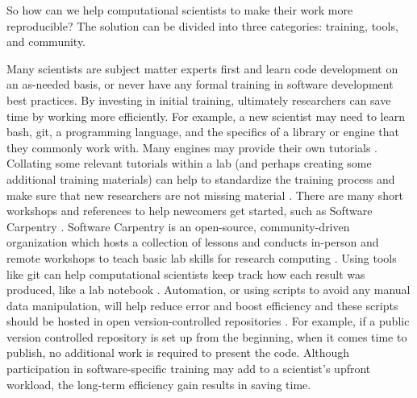 So how can we help computational scientists to make their work more reproducible?
The solution can be divided into three categories: training, tools, and community.

Many scientists are subject matter experts first and learn code development on an as-needed basis, or never have any formal training in software development best practices. 
By investing in initial training, ultimately researchers can save time by working more efficiently.
For example, a new scientist may need to learn bash, git, a programming language, and the specifics of a library or engine that they commonly work with.
Many engines may provide their own tutorials \cite{hoomd_tutorials, Lemkul2019, Lemkul2020}.
Collating some relevant tutorials within a lab (and perhaps creating some additional training materials) can help to standardize the training process and make sure that new researchers are not missing material \cite{notebooktutorials}.
There are many short workshops and references to help newcomers get started, such as Software Carpentry \cite{Wilson2014}.
Software Carpentry is an open-source, community-driven organization which hosts a collection of lessons and conducts in-person and remote workshops to teach basic lab skills for research computing \cite{swc-main}.
Using tools like git can help computational scientists keep track how each result was produced, like a lab notebook \cite{Sandve2013}.
Automation, or using scripts to avoid any manual data manipulation, will help reduce error and boost efficiency and these scripts should be hosted in open version-controlled repositories \cite{Sandve2013}.
For example, if a public version controlled repository is set up from the beginning, when it comes time to publish, no additional work is required to present the code.
Although participation in software-specific training may add to a scientist's upfront workload, the long-term efficiency gain results in saving time.

